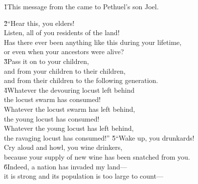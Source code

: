 


\v{1}This message from the  came to Pethuel's son Joel.

\begin{poetry}
\poeml \v{2}``Hear this, you elders! \\
\poeml Listen, all of you residents of the land! \\
\poeml Has there ever been anything like this during your lifetime, \\
\poemll    or even when your ancestors were alive? \\
\poeml \v{3}Pass it on to your children, \\
\poemll    and from your children to their children, \\
\poemlll       and from their children to the following generation. \\
\poeml \v{4}Whatever the devouring locust left behind \\
\poemll    the locust swarm has consumed! \\
\poeml Whatever the locust swarm has left behind, \\
\poemll    the young locust has consumed! \\
\poeml Whatever the young locust has left behind, \\
\poemll    the ravaging locust has consumed!''
\poeml \v{5}``Wake up, you drunkards! \\
\poemll    Cry aloud and howl, you wine drinkers, \\
\poemlll       because your supply of new wine has been snatched from you. \\
\poeml \v{6}Indeed, a nation has invaded my land--- \\
\poemll    it is strong and its population is too large to count--- \\

\end{poetry}
